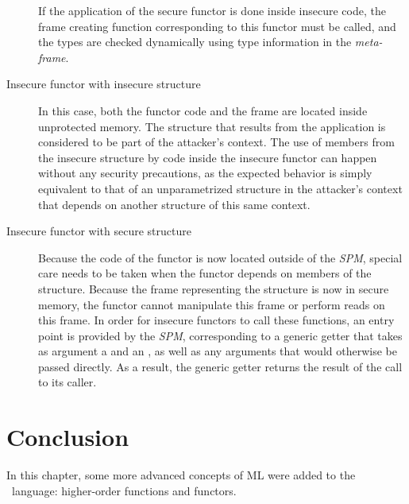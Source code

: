 \begin{description}
If the application of the secure functor is done inside insecure code, the frame creating function corresponding to this functor must be called, and the types are checked dynamically using type information in the \emph{meta-frame}.
\item[Insecure functor with insecure structure]
In this case, both the functor code and the frame are located inside unprotected memory.
The structure that results from the application is considered to be part of the attacker's context.
The use of members from the insecure structure by code inside the insecure functor can happen without any security precautions, as the expected behavior is simply equivalent to that of an unparametrized structure in the attacker's context that depends on another structure of this same context.
\item[Insecure functor with secure structure]
Because the code of the functor is now located outside of the \emph{SPM}, special care needs to be taken when the functor depends on members of the structure.
Because the frame  representing the structure is now in secure memory, the functor cannot manipulate this frame or perform reads on this frame.
In order for insecure functors to call these functions, an entry point is provided by the \emph{SPM}, corresponding to a generic getter that takes as argument a  and an , as well as any arguments that would otherwise be passed directly.
As a result, the generic getter returns the result of the call to its caller.
\end{description}


\section{Conclusion}
In this chapter, some more advanced concepts of ML were added to the \MiniML\ language: higher-order functions and functors.

